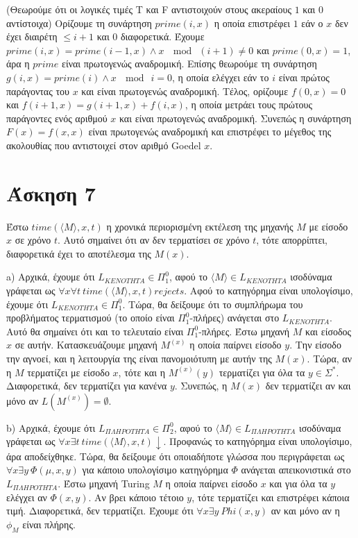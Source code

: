 \documentclass[a4paper, oneside, 11pt]{article}
\theoremstyle{definition}
\begin{document}
(Θεωρούμε ότι οι λογικές τιμές T και F αντιστοιχούν στους ακεραίους $1$ και $0$ αντίστοιχα)
Ορίζουμε τη συνάρτηση $prime(i,x)$ η οποία επιστρέφει $1$ εάν ο $x$ δεν έχει διαιρέτη $\leq i+1$ και $0$ διαφορετικά.
Έχουμε $prime(i,x)=prime(i-1,x)\land x\ \mod\ (i+1)\neq 0$ και $prime(0,x)=1$, άρα η $prime$ είναι πρωτογενώς αναδρομική.
Επίσης θεωρούμε τη συνάρτηση $g(i,x)=prime(i)\land x\ \mod\ i=0$, η οποία ελέγχει εάν το $i$ είναι πρώτος παράγοντας του $x$ και
είναι πρωτογενώς αναδρομική. Τέλος, ορίζουμε $f(0,x)=0$ και $f(i+1,x)=g(i+1,x) + f(i,x)$, η οποία μετράει τους πρώτους παράγοντες
ενός αριθμού $x$ και είναι πρωτογενώς αναδρομική. Συνεπώς η συνάρτηση $F(x)=f(x,x)$ είναι πρωτογενώς αναδρομική και επιστρέφει
το μέγεθος της ακολουθίας που αντιστοιχεί στον αριθμό Goedel $x$.


\section*{Άσκηση 7}
Έστω $time(\langle M\rangle, x, t)$ η χρονικά περιορισμένη εκτέλεση της μηχανής $M$ με είσοδο $x$ σε χρόνο $t$. Αυτό σημαίνει ότι αν δεν τερματίσει σε χρόνο $t$, τότε απορρίπτει,
διαφορετικά έχει το αποτέλεσμα της $M(x)$.

a) Αρχικά, έχουμε ότι $L_{KENOTHTA}\in \Pi_1^0$, αφού το $\langle M\rangle\in L_{KENOTHTA}$ ισοδύναμα γράφεται ως $\forall x\forall t\ time(\langle M\rangle,x,t) rejects$. 
Αφού το κατηγόρημα είναι υπολογίσιμο, έχουμε ότι $L_{KENOTHTA}\in \Pi_1^0$.
Τώρα, θα δείξουμε ότι το συμπλήρωμα του προβλήματος τερματισμού (το οποίο είναι $\Pi_1^0$-πλήρες) ανάγεται στο $L_{KENOTHTA}$. Αυτό θα σημαίνει ότι και το τελευταίο είναι 
$\Pi_1^0$-πλήρες. Έστω μηχανή $M$ και είσοδος $x$ σε αυτήν. Κατασκευάζουμε μηχανή $M^{(x)}$ η οποία παίρνει είσοδο $y$. Την είσοδο την αγνοεί, και η λειτουργία της είναι
πανομοιότυπη με αυτήν της $M(x)$. Τώρα, αν η $M$ τερματίζει με είσοδο $x$, 
τότε και η $M^{(x)}(y)$ τερματίζει για όλα τα $y\in\Sigma^*$. Διαφορετικά, δεν τερματίζει για κανένα $y$.
Συνεπώς, η $M(x)$ δεν τερματίζει αν και μόνο αν $L(M^{(x)})=\emptyset$.

b) Αρχικά, έχουμε ότι $L_{\Pi\Lambda HPOTHTA}\in \Pi_2^0$, αφού το $\langle M\rangle\in L_{\Pi\Lambda HPOTHTA}$ ισοδύναμα γράφεται ως
$\forall x\exists t\ time(\langle M\rangle, x,t)\downarrow$. Προφανώς το κατηγόρημα είναι υπολογίσιμο, άρα αποδείχθηκε.
Τώρα, θα δείξουμε ότι οποιαδήποτε γλώσσα που περιγράφεται ως $\forall x\exists y\ \Phi (\mu, x,y)$ για κάποιο υπολογίσιμο κατηγόρημα $\Phi$ ανάγεται απεικονιστικά στο
$L_{\Pi\Lambda HPOTHTA}$.
Έστω μηχανή Turing $M$ η οποία παίρνει είσοδο $x$ και για όλα τα $y$ ελέγχει αν $\Phi(x,y)$. Αν βρει κάποιο τέτοιο $y$, τότε τερματίζει και επιστρέφει κάποια τιμή.
Διαφορετικά, δεν τερματίζει. Έχουμε ότι $\forall x\exists y\ Phi(x,y)$ αν και μόνο αν η $\phi_M$ είναι πλήρης.
\end{document}

